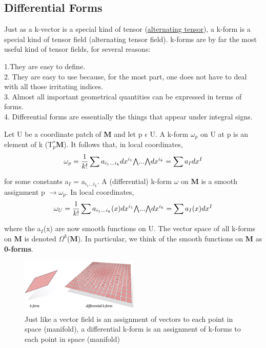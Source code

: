 \subsection{Differential Forms}
Just as a k-vector is a special kind of tensor (\href{https://web2.clarkson.edu/projects/subramanian/ch490/notes/Alternating%20Unit%20Tensor.pdf}{alternating tensor}), a k-form is a
special kind of tensor field (alternating tensor field).  
k-forms are by far the most useful kind of tensor fields, for several reasons:

1.They are easy to define. \\
2. They are easy to use because, for the most part, one does not have to deal with all those irritating indices. \\
3. Almost all important geometrical quantities can be expressed in terms of forms. \\
4. Differential forms are essentially the things that appear under integral signs.

Let U be a coordinate patch of \textbf{M} and let p $\epsilon$ U. A k-form $\omega_p$ on U at p is an element of k (T$_p^*$\textbf{M}). 
It follows that, in local coordinates,
\begin{equation}
    \omega_p = \frac{1}{k!}\sum a_{i_1...i_k}dx^{i_1}\exterior...\exterior dx^{i_k} = \sum a_I dx^I
\end{equation}

for some constants a$_I$ = a$_{i_1...i_k}$. A (differential) k-form $\omega$ on \textbf{M} is a smooth
assignment p $\rightarrow \omega_p$. In local coordinates,
\begin{equation}
    \omega_U = \frac{1}{k!}\sum a_{i_1...i_k}(x)dx^{i_1}\exterior...\exterior dx^{i_k} = \sum a_I(x) dx^I
\end{equation}

where the a$_I$(x) are now smooth functions on U. 
The vector space of all k-forms on \textbf{M} is denoted $\Omega^k$(\textbf{M}). 
In particular, we think of the smooth functions on \textbf{M} as \textbf{0-forms}.

\begin{figure}[h]
    \begin{center}
        \includegraphics[width=0.5\textwidth]{figures/differential_k-form.png}
        \caption{Just like a vector field is an assignment of vectors to each point in space (manifold), 
        a differential k-form is an assignment of k-forms to each point in space (manifold)}
    \end{center}
\end{figure}

\newpage
